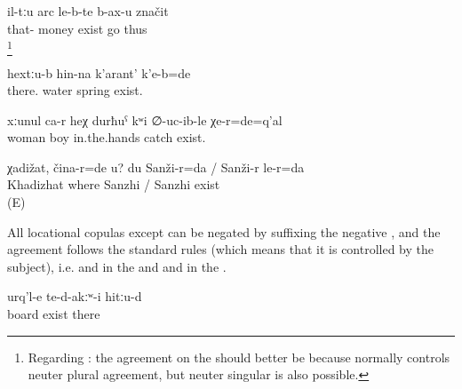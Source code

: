 \begin{exe}
	\ex	\label{ex:This means that (people) go where the money is}
	\gll	il-tːu	arc	le-b-te 	b-ax-u	značit\\
		that-	money	exist 	go	thus\\
	\glt	{}\footnote{Regarding : the agreement on the  should better be  because   normally controls neuter plural agreement, but neuter singular is also possible.}

	\ex	\label{ex:There was a spring up there}
	\gll	hextːu-b	hin-na	k'arant'	k'e-b=de\\
		there.	water	spring	exist.\\
	\glt	{}

	\ex	\label{ex:That is the woman, the one who was keeping the boy in here hands}
	\gll	xːunul	ca-r	heχ	durħuˁ	kʷi	∅-uc-ib-le	χe-r=de=q'al\\
		woman			boy	in.the.hands	catch	exist.\\
	\glt	{}

	\ex	\label{ex:‎Khadizhat, where are you? I am in Sanzhi_1}
	\gll	χadižat,	čina-r=de	u?	du	Sanži-r=da	/	Sanži-r	le-r=da\\
		Khadizhat	where			Sanzhi	/ Sanzhi exist\\
	\glt	{} (E)

\end{exe}

All locational copulas except  can be negated by suffixing the negative , and the  agreement follows the standard rules (which means that it is controlled by the subject), i.e.  and   in the  and  and  in the  .

\begin{exe}
	\ex	\label{ex:There were no boards there}
	\gll	urq'l-e	te-d-akːʷ-i	hitːu-d\\
		board	exist	there\\
	\glt	{}
\end{exe}

